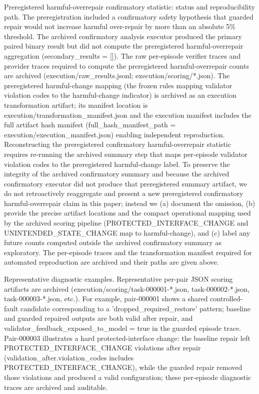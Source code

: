 \documentclass[conference]{IEEEtran}
\begin{document}
Preregistered harmful-overrepair confirmatory statistic: status and reproducibility path. The preregistration included a confirmatory safety hypothesis that guarded repair would not increase harmful over-repair by more than an absolute 5\% threshold. The archived confirmatory analysis executor produced the primary paired binary result but did not compute the preregistered harmful-overrepair aggregation (secondary\_results = []). The raw per-episode verifier traces and provider traces required to compute the preregistered harmful-overrepair counts are archived (execution/raw\_results.jsonl; execution/scoring/*.json). The preregistered harmful-change mapping (the frozen rules mapping validator violation codes to the harmful-change indicator) is archived as an execution transformation artifact; its manifest location is execution/transformation\_manifest.json and the execution manifest includes the full artifact hash manifest (full\_hash\_manifest\_path = execution/execution\_manifest.json) enabling independent reproduction. Reconstructing the preregistered confirmatory harmful-overrepair statistic requires re-running the archived summary step that maps per-episode validator violation codes to the preregistered harmful-change label. To preserve the integrity of the archived confirmatory summary and because the archived confirmatory executor did not produce that preregistered summary artifact, we do not retroactively reaggregate and present a new preregistered confirmatory harmful-overrepair claim in this paper; instead we (a) document the omission, (b) provide the precise artifact locations and the compact operational mapping used by the archived scoring pipeline (PROTECTED\_INTERFACE\_CHANGE and UNINTENDED\_STATE\_CHANGE map to harmful-change), and (c) label any future counts computed outside the archived confirmatory summary as exploratory. The per-episode traces and the transformation manifest required for automated reproduction are archived and their paths are given above.

Representative diagnostic examples. Representative per-pair JSON scoring artifacts are archived (execution/scoring/task-000001-*.json, task-000002-*.json, task-000003-*.json, etc.). For example, pair-000001 shows a shared controlled-fault candidate corresponding to a 'dropped\_required\_restore' pattern; baseline and guarded repaired outputs are both valid after repair, and validator\_feedback\_exposed\_to\_model = true in the guarded episode trace. Pair-000003 illustrates a hard protected-interface change: the baseline repair left PROTECTED\_INTERFACE\_CHANGE violations after repair (validation\_after.violation\_codes includes PROTECTED\_INTERFACE\_CHANGE), while the guarded repair removed those violations and produced a valid configuration; these per-episode diagnostic traces are archived and auditable.
\end{document}
